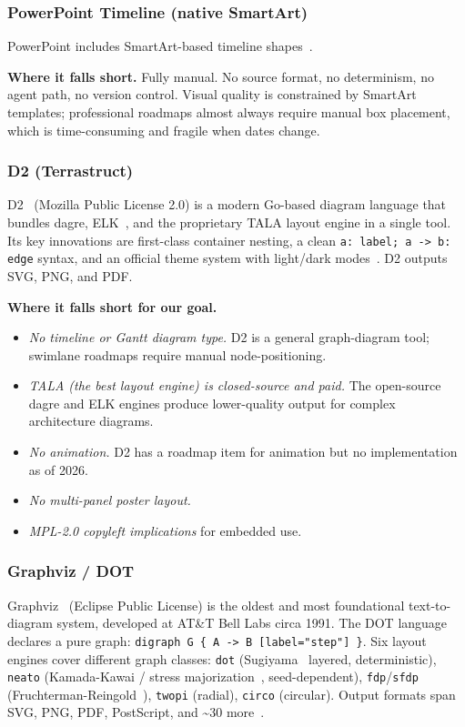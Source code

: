 \subsubsection{PowerPoint Timeline (native SmartArt)}

PowerPoint includes SmartArt-based timeline shapes~\cite{powerpoint-timeline}.

\medskip\noindent
\textbf{Where it falls short.}
Fully manual.  No source format, no determinism, no agent path, no
version control.  Visual quality is constrained by SmartArt templates;
professional roadmaps almost always require manual box placement, which
is time-consuming and fragile when dates change.

\subsubsection{D2 (Terrastruct)}

D2~\cite{d2lang} (Mozilla Public License 2.0) is a modern Go-based
diagram language that bundles dagre, ELK~\cite{elk}, and the proprietary
TALA layout engine in a single tool.
Its key innovations are first-class container nesting, a clean
\texttt{a: label; a -> b: edge} syntax, and an official theme system
with light/dark modes~\cite{d2lang}.
D2 outputs SVG, PNG, and PDF.

\medskip\noindent
\textbf{Where it falls short for our goal.}
\begin{itemize}
  \item \emph{No timeline or Gantt diagram type.}  D2 is a general
        graph-diagram tool; swimlane roadmaps require manual
        node-positioning.
  \item \emph{TALA (the best layout engine) is closed-source and paid.}
        The open-source dagre and ELK engines produce lower-quality
        output for complex architecture diagrams.
  \item \emph{No animation.}
        D2 has a roadmap item for animation but no implementation as of 2026.
  \item \emph{No multi-panel poster layout.}
  \item \emph{MPL-2.0 copyleft implications} for embedded use.
\end{itemize}

\subsubsection{Graphviz / DOT}

Graphviz~\cite{graphviz} (Eclipse Public License) is the oldest and
most foundational text-to-diagram system, developed at AT\&T Bell Labs
circa 1991.  The DOT language declares a pure graph:
\texttt{digraph G \{ A -> B [label="step"] \}}.
Six layout engines cover different graph classes: \texttt{dot}
(Sugiyama~\cite{sugiyama1981} layered, deterministic), \texttt{neato}
(Kamada-Kawai / stress majorization~\cite{gansnerStressMaj2004},
seed-dependent), \texttt{fdp}/\texttt{sfdp}
(Fruchterman-Reingold~\cite{fruchterman1991}), \texttt{twopi}
(radial), \texttt{circo} (circular).
Output formats span SVG, PNG, PDF, PostScript, and \textasciitilde30
more~\cite{graphviz}.

